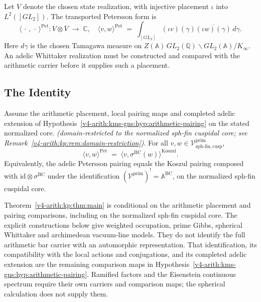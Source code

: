 Let \(V\) denote the chosen state realization, with injective
placement \(\iota\) into \(L^2([GL_2])\). The transported Petersson
form is
\begin{equation}
\label{v4-arith:kp:eq:Pet-pairing-def}
\langle\,\cdot\,,\,\cdot\,\rangle^{\mathrm{Pet}}
\colon V\otimes\overline V\;\longrightarrow\;\mathbb{C},
\quad
\langle v,w\rangle^{\mathrm{Pet}}
\;=\;\int_{[GL_{2}]}(\iota v)(\gamma)\overline{(\iota w)(\gamma)}\,d\gamma.
\end{equation}
Here \(d\gamma\) is the chosen Tamagawa measure on
\(Z(\mathbb{A})\,GL_{2}(\mathbb{Q})\backslash GL_{2}(\mathbb{A})/K_{\infty}\).
An adelic Whittaker realization
must be constructed and compared with the arithmetic carrier before
it supplies such a placement.

\subsection{The Identity}
\label{v4-arith:kp:identity}

\begin{theorem}
\label{v4-arith:kp:thm:main}
Assume the arithmetic placement, local pairing maps and completed
adelic extension of Hypothesis~\ref{v4-arith:kms-gns:hyp:arithmetic-pairing}
on the stated normalized core.
\emph{(domain-restricted to the normalized
sph-fin cuspidal core; see
Remark~\ref{v4-arith:kp:rem:domain-restriction})}. For all
\(v,w\in\mathcal{V}^{\mathrm{prim}}_{\mathrm{sph\text{-}fin,cusp}}\),
\begin{equation}
\label{v4-arith:kp:eq:main}
\langle v,w\rangle^{\mathrm{Pet}}
\;=\;
\langle v,\sigma^{\mathrm{BC}}(w)\rangle^{\mathrm{Koszul}}.
\end{equation}
Equivalently, the adelic Petersson pairing equals the Koszul
pairing composed with \(\mathrm{id}\otimes\sigma^{\mathrm{BC}}\)
under the identification
\((\mathcal{V}^{\mathrm{prim}})^{!}=\mathbb{A}^{\mathrm{BC}}\), on the
normalized sph-fin cuspidal core.
\end{theorem}

\begin{remark}
\label{v4-arith:kp:rem:domain-restriction}
Theorem~\ref{v4-arith:kp:thm:main} is conditional on the arithmetic
placement and pairing comparisons, including on the normalized
sph-fin cuspidal core. The explicit constructions below give weighted
occupation, prime Gibbs, spherical Whittaker and archimedean vacuum-line
models. They do not identify the full arithmetic bar carrier with an
automorphic representation. That identification, its compatibility
with the local actions and conjugations, and its completed adelic
extension are the remaining comparison maps in
Hypothesis~\ref{v4-arith:kms-gns:hyp:arithmetic-pairing}.
Ramified factors and the Eisenstein continuous spectrum require their
own carriers and comparison maps; the spherical calculation does not
supply them.
\end{remark}

